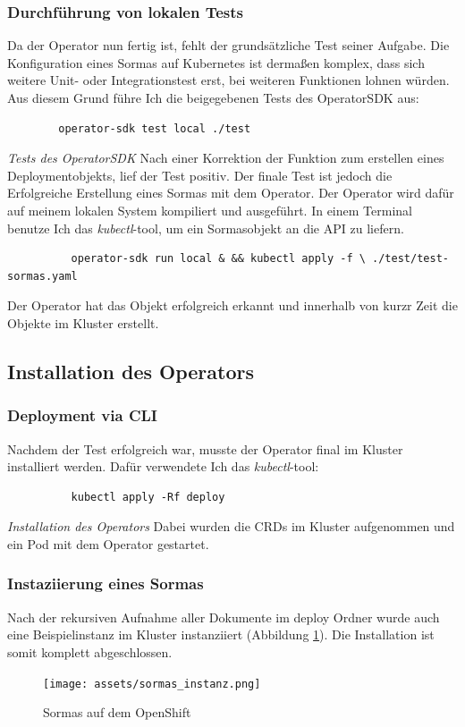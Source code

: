 \documentclass[a4paper,11pt]{article}
\begin{document}
      \subsubsection{Durchführung von lokalen Tests}
      Da der Operator nun fertig ist, fehlt der grundsätzliche Test seiner Aufgabe.
      Die Konfiguration eines Sormas auf Kubernetes ist dermaßen komplex, dass sich weitere Unit- oder Integrationstest erst, bei weiteren Funktionen 
      lohnen würden. Aus diesem Grund führe Ich die beigegebenen Tests des OperatorSDK aus:
      \begin{lstlisting}
        operator-sdk test local ./test
      \end{lstlisting}
      \emph{Tests des OperatorSDK}
      Nach einer Korrektion der Funktion zum erstellen eines Deploymentobjekts, lief der Test positiv.
      Der finale Test ist jedoch die Erfolgreiche Erstellung eines Sormas mit dem Operator.
      Der Operator wird dafür auf meinem lokalen System kompiliert und ausgeführt. In einem  Terminal benutze Ich 
      das \emph{kubectl}-tool, um ein Sormasobjekt an die API zu liefern.
      \begin{lstlisting}
          operator-sdk run local & && kubectl apply -f \ ./test/test-sormas.yaml
      \end{lstlisting}
      Der Operator hat das Objekt erfolgreich erkannt und
      innerhalb von kurzr Zeit die Objekte im Kluster erstellt.  
    \subsection{Installation des Operators}
      \subsubsection{Deployment via CLI}
      Nachdem der Test erfolgreich war, musste der Operator final im Kluster installiert werden.
      Dafür verwendete Ich das \emph{kubectl}-tool:
      \begin{lstlisting}
          kubectl apply -Rf deploy
      \end{lstlisting}
      \emph{Installation des Operators}
      Dabei wurden die CRDs im Kluster aufgenommen und ein Pod mit dem Operator gestartet.
      \subsubsection{Instaziierung eines Sormas}
      Nach der rekursiven Aufnahme aller Dokumente im deploy Ordner wurde auch eine Beispielinstanz im Kluster
      instanziiert (Abbildung \ref{fig:sormas}). Die Installation ist somit komplett abgeschlossen.
      \begin{figure}[!ht]
        \texttt{[image: assets/sormas\_instanz.png]}
        \caption{Sormas auf dem OpenShift}
        \label{fig:sormas}
      \end{figure}
\end{document}
